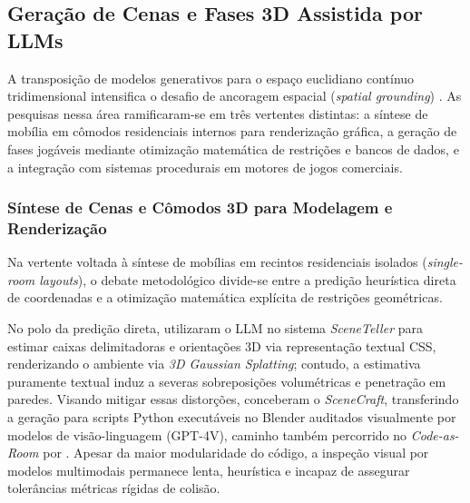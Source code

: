 \subsection{Geração de Cenas e Fases 3D Assistida por LLMs}
\label{sec:relacionados_3d}

A transposição de modelos generativos para o espaço euclidiano contínuo tridimensional intensifica o desafio de ancoragem espacial (\textit{spatial grounding}) \cite{Gallotta_2024, maleki2024procedural}. As pesquisas nessa área ramificaram-se em três vertentes distintas: a síntese de mobília em cômodos residenciais internos para renderização gráfica, a geração de fases jogáveis mediante otimização matemática de restrições e bancos de dados, e a integração com sistemas procedurais em motores de jogos comerciais.

\subsubsection{Síntese de Cenas e Cômodos 3D para Modelagem e Renderização}
\label{sec:relacionados_cenas_3d}

Na vertente voltada à síntese de mobílias em recintos residenciais isolados (\textit{single-room layouts}), o debate metodológico divide-se entre a predição heurística direta de coordenadas e a otimização matemática explícita de restrições geométricas.

No polo da predição direta, \textcite{ocal2024sceneteller} utilizaram o LLM no sistema \textit{SceneTeller} para estimar caixas delimitadoras e orientações 3D via representação textual CSS, renderizando o ambiente via \textit{3D Gaussian Splatting}; contudo, a estimativa puramente textual induz a severas sobreposições volumétricas e penetração em paredes. Visando mitigar essas distorções, \textcite{hu2024scenecraft} conceberam o \textit{SceneCraft}, transferindo a geração para scripts Python executáveis no Blender auditados visualmente por modelos de visão-linguagem (GPT-4V), caminho também percorrido no \textit{Code-as-Room} por \textcite{yang2026codeasroomgenerating3drooms}. Apesar da maior modularidade do código, a inspeção visual por modelos multimodais permanece lenta, heurística e incapaz de assegurar tolerâncias métricas rígidas de colisão.

